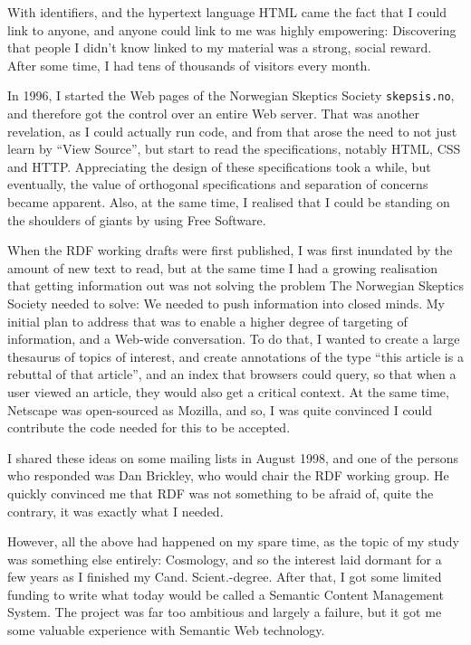 With identifiers, and the hypertext language HTML came the fact that I
could link to anyone, and anyone could link to me was highly
empowering: Discovering that people I didn't know linked to my
material was a strong, social reward. After some time, I had tens of
thousands of visitors every month.

In 1996, I started the Web pages of the Norwegian Skeptics Society
\texttt{skepsis.no}, and therefore got the control over an entire Web
server. That was another revelation, as I could actually run code, and
from that arose the need to not just learn by ``View Source'', but
start to read the specifications, notably HTML, CSS and
HTTP. Appreciating the design of these specifications took a while,
but eventually, the value of orthogonal specifications and separation
of concerns became apparent. Also, at the same time, I realised that I
could be standing on the shoulders of giants by using Free Software.

When the RDF working drafts were first published, I was first
inundated by the amount of new text to read, but at the same time I
had a growing realisation that getting information out was not solving
the problem The Norwegian Skeptics Society needed to solve: We needed
to push information into closed minds. My initial plan to address that
was to enable a higher degree of targeting of information, and a Web-wide
conversation. To do that, I wanted to create a large thesaurus of
topics of interest, and create annotations of the type ``this article
is a rebuttal of that article'', and an index that browsers could
query, so that when a user viewed an article, they would also get a
critical context. At the same time, Netscape was open-sourced as
Mozilla, and so, I was quite convinced I could contribute the code
needed for this to be accepted. 

I shared these ideas on some mailing lists in August 1998, and one of
the persons who responded was Dan Brickley, who would chair the RDF
working group. He quickly convinced me that RDF was not something to
be afraid of, quite the contrary, it was exactly what I needed.

However, all the above had happened on my spare time, as the topic of
my study was something else entirely: Cosmology, and so the interest
laid dormant for a few years as I finished my Cand. Scient.-degree. 
After that, I got some limited funding to write what today would be
called a Semantic Content Management System. The project was far too
ambitious and largely a failure, but it got me some valuable
experience with Semantic Web technology.

